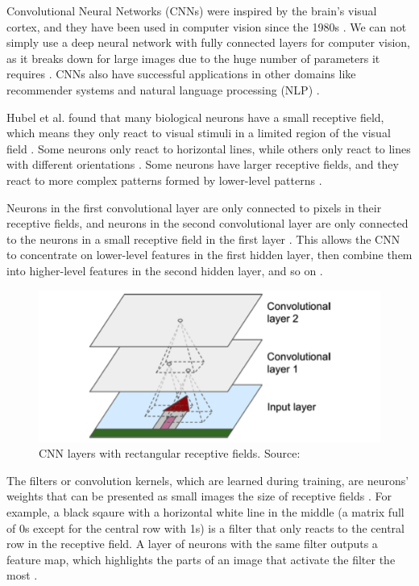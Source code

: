 \documentclass[a4paper,11pt,oneside]{article}
\begin{document}
  Convolutional Neural Networks (CNNs) were inspired by the brain's visual cortex, and they have been used in computer
  vision since the 1980s \cite{geron2019hands}. We can not simply use a deep neural network with fully connected layers
  for computer vision, as it breaks down for large images due to the huge number of parameters it requires
  \cite{geron2019hands}. CNNs also have successful applications in other domains like recommender systems
  \cite{van2013deep} and natural language processing (NLP) \cite{collobert2008unified}.

  Hubel et al. \cite{hubel1959single, hubel1959receptive, hubel1968receptive} found that many biological neurons have
  a small receptive field, which  means they only react to visual stimuli in a limited region of the visual field
  \cite{geron2019hands}. Some neurons only react to horizontal lines, while others only react to lines with
  different orientations \cite{geron2019hands}. Some neurons have larger receptive fields, and they react to more complex
  patterns formed by lower-level patterns \cite{geron2019hands}.

  Neurons in the first convolutional layer are only connected to pixels in their receptive fields, and neurons in the
  second convolutional layer are only connected to the neurons in a small receptive field in the first layer
  \cite{geron2019hands}. This allows the CNN to concentrate on lower-level features in the first hidden layer, then
  combine them into higher-level features in the second hidden layer, and so on \cite{geron2019hands}.

  \begin{figure}[ht]
    \begin{center}
      \includegraphics[width=.8\textwidth]{cnn_layers.png}
    \end{center}
    \caption{CNN layers with rectangular receptive fields. Source: \cite{geron2019hands}}
  \end{figure}

  The filters or convolution kernels, which are learned during training, are neurons' weights that can be presented as
  small images the size of receptive fields \cite{geron2019hands}. For example, a black sqaure with a horizontal white
  line in the middle (a matrix full of 0s except for the central row with 1s) is a filter that only reacts to the central
  row in the receptive field. A layer of neurons with the same filter outputs a feature map, which highlights the parts
  of an image that activate the filter the most \cite{geron2019hands}.
\end{document}
